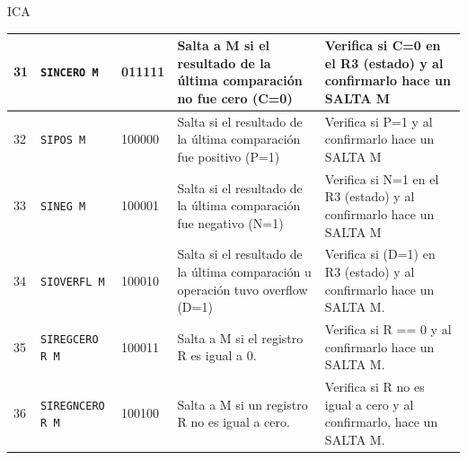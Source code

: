 ICA\documentclass{article}
\begin{document}
\begin{longtable}{|p{}|p{}|p{}|p{}|p{}|}
  \hline
  31                 & \texttt{SINCERO M}                               & 011111                          & Salta a M si el resultado de la última comparación no fue cero (C=0)                                                                                                                                                          & Verifica si C=0 en el R3 (estado) y al confirmarlo hace un SALTA M                                                     \\
  \hline
  32                 & \texttt{SIPOS M}                                 & 100000                          & Salta si el resultado de la última comparación fue positivo (P=1)                                                                                                                                                             & Verifica si P=1 y al confirmarlo hace un SALTA M                                                                       \\
  \hline
  33                 & \texttt{SINEG M}                                 & 100001                          & Salta si el resultado de la última comparación fue negativo (N=1)                                                                                                                                                             & Verifica si N=1 en el R3 (estado) y al confirmarlo hace un SALTA M                                                     \\
  \hline
  34                 & \texttt{SIOVERFL M}                              & 100010                          & Salta si el resultado de la última comparación u operación tuvo overflow (D=1)                                                                                                                                                & Verifica si (D=1) en R3 (estado) y al confirmarlo hace un SALTA M.                                                     \\
  \hline
  35                 & \texttt{SIREGCERO R M}                           & 100011                          & Salta a M si el registro R es igual a 0.                                                                                                                                                                                      & Verifica si R == 0 y al confirmarlo hace un SALTA M.                                                                   \\
  \hline
  36                 & \texttt{SIREGNCERO R M}                          & 100100                          & Salta a M si un registro R no es igual a cero.                                                                                                                                                                                & Verifica si R no es igual a cero y al confirmarlo, hace un SALTA M.                                                    \\

\end{longtable}
\end{document}
